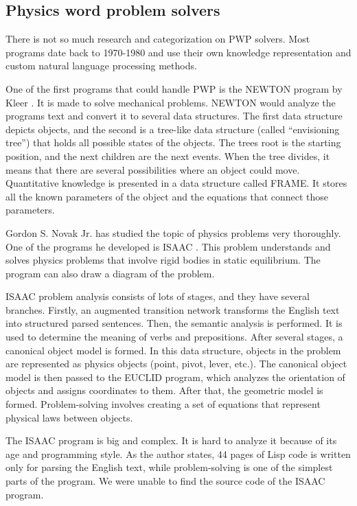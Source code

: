 \documentclass[a4paper, 12pt]{article}
\begin{document}
	\subsection{Physics word problem solvers}
	
	There is not so much research and categorization on PWP solvers. Most
	programs date back to 1970-1980 and use their own knowledge
	representation and custom natural language processing methods.
	
	One of the first programs that could handle PWP is the NEWTON program by
	Kleer \cite{newton}. It is made to solve mechanical problems. NEWTON would
	analyze the program\textquotesingle s text and convert it to several
	data structures. The first data structure depicts objects, and the
	second is a tree-like data structure (called \enquote{envisioning tree}) that
	holds all possible states of the objects. The tree\textquotesingle s
	root is the starting position, and the next children are the next
	events. When the tree divides, it means that there are several
	possibilities where an object could move. Quantitative knowledge is
	presented in a data structure called FRAME. It stores all the known
	parameters of the object and the equations that connect those
	parameters.
	
	Gordon S. Novak Jr. has studied the topic of physics problems very
	thoroughly. One of the programs he developed is ISAAC \cite{isaac}. This
	problem understands and solves physics problems that involve rigid
	bodies in static equilibrium. The program can also draw a diagram of the
	problem.
	
	ISAAC problem analysis consists of lots of stages, and they have several
	branches. Firstly, an augmented transition network transforms the
	English text into structured parsed sentences. Then, the semantic
	analysis is performed. It is used to determine the meaning of verbs and
	prepositions. After several stages, a canonical object model is formed.
	In this data structure, objects in the problem are represented as
	physics objects (point, pivot, lever, etc.). The canonical object model
	is then passed to the EUCLID program, which analyzes the orientation of
	objects and assigns coordinates to them. After that, the geometric model
	is formed. Problem-solving involves creating a set of equations that
	represent physical laws between objects.
	
	The ISAAC program is big and complex. It is hard to analyze it because
	of its age and programming style. As the author states, 44 pages of Lisp
	code is written only for parsing the English text, while problem-solving
	is one of the simplest parts of the program. We were unable to find the
	source code of the ISAAC program.
	
\end{document}

